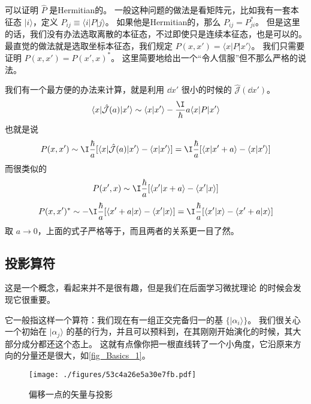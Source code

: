 \begin{example}{}
可以证明 $\hat{P}$ 是Hermitian的。 一般这种问题的做法是看矩阵元，比如我有一套本征态 $|i\rangle$，定义 $P_{ij} \equiv \langle i|P|j\rangle$。 如果他是Hermitian的，那么 $P_{ij} = P_{ji}^*$。 但是这里的话，我们没有办法选取离散的本征态，不过即使只是连续本征态，也是可以的。 最直觉的做法就是选取坐标本征态，我们规定 $P(x,x') = \langle x|P|x'\rangle$。 我们只需要证明 $P(x,x') = P(x',x)^*$。 这里简要地给出一个“令人信服”但不那么严格的说法。

我们有一个最方便的办法来计算，就是利用 $\dd{x'}$ 很小的时候的 $\hat{\mathcal{J}}(\dd{x'})$。
\begin{equation}
\langle x|\hat{\mathcal{J}}(a)|x'\rangle \sim \langle x|x'\rangle - \frac{\I}{\hbar} a \langle x|P|x'\rangle
\end{equation}
也就是说
\begin{equation}
P(x,x') \sim \I\frac{\hbar}{a}[\langle x|\hat{\mathcal{J}}(a)|x'\rangle - \langle x|x'\rangle] = \I\frac{\hbar}{a}[\langle x|x'+a\rangle - \langle x|x'\rangle]
\end{equation}
而很类似的
\begin{equation}
P(x',x) \sim \I\frac{\hbar}{a}[\langle x'|x+a\rangle - \langle x'|x\rangle]
\end{equation}
\begin{equation}
P(x,x')^* \sim -\I\frac{\hbar}{a} [\langle x'+a|x\rangle - \langle x'|x\rangle] = \I\frac{\hbar}{a} [\langle x'|x\rangle - \langle x'+a|x\rangle]
\end{equation}
取 $a\rightarrow0$，上面的式子严格等于，而且两者的关系更一目了然。
\end{example}

\subsection{投影算符}

这是一个概念，看起来并不是很有趣，但是我们在后面学习微扰理论%
的时候会发现它很重要。

它一般指这样一个算符：我们现在有一组正交完备归一的基 $\{|\alpha_i\rangle\}$。 我们很关心一个初始在 $|\alpha_j\rangle$ 的基的行为，并且可以预料到，在其刚刚开始演化的时候，其大部分成分都还这个态上。 这就有点像你把一根直线转了一个小角度，它沿原来方向的分量还是很大，如\autoref{fig_Basics_1}。

\begin{figure}[ht]
\centering
\texttt{[image: ./figures/53c4a26e5a30e7fb.pdf]}
\caption{偏移一点的矢量与投影} \label{fig_Basics_1}
\end{figure}

